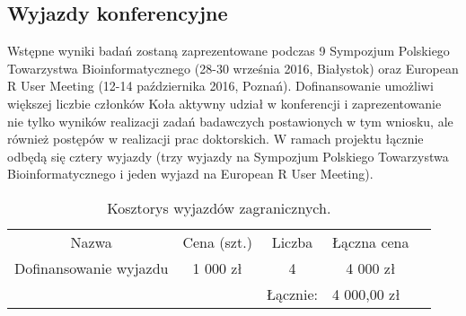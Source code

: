 \documentclass{article}
\begin{document}
\subsection{Wyjazdy konferencyjne}

Wstępne wyniki badań zostaną zaprezentowane podczas 9 Sympozjum Polskiego 
Towarzystwa Bioinformatycznego (28-30 września 2016, Białystok) oraz European R 
User Meeting (12-14 października 2016, Poznań). Dofinansowanie 
umożliwi większej liczbie członków Koła aktywny udział w konferencji i 
zaprezentowanie nie tylko wyników realizacji zadań badawczych postawionych w tym 
wniosku, ale również postępów w realizacji prac doktorskich. W ramach projektu 
łącznie odbędą się cztery wyjazdy (trzy wyjazdy na Sympozjum Polskiego 
Towarzystwa Bioinformatycznego i jeden wyjazd na European R 
User Meeting).

\begin{table}[!htbp]
\centering
\caption*{Kosztorys wyjazdów zagranicznych.}
\begin{tabular}{lllll}
\cline{1-4}
\multicolumn{1}{|c|}{Nazwa}                     & \multicolumn{1}{c|}{Cena (szt.)} & \multicolumn{1}{c|}{Liczba} & \multicolumn{1}{c|}{Łączna cena} &  \\ \cline{1-4}
\multicolumn{1}{|c|}{Dofinansowanie wyjazdu} & \multicolumn{1}{c|}{1 000 zł}    
 & \multicolumn{1}{c|}{4}      & \multicolumn{1}{c|}{4 000 zł}     &  \\ 
\cline{1-4}
                                                &                                
  & Łącznie:                    & 4 000,00 zł                          & 
\end{tabular}
\end{table}


 

\end{document}
